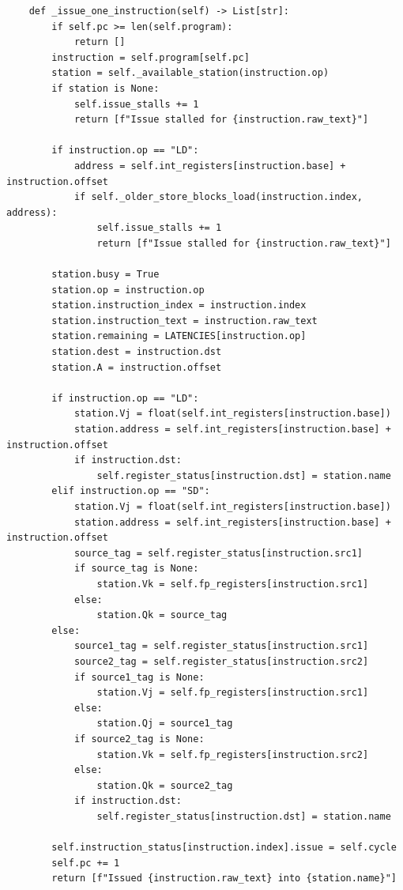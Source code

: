 \documentclass[12pt,a4paper]{ctexart}
\begin{document}
\begin{lstlisting}
    def _issue_one_instruction(self) -> List[str]:
        if self.pc >= len(self.program):
            return []
        instruction = self.program[self.pc]
        station = self._available_station(instruction.op)
        if station is None:
            self.issue_stalls += 1
            return [f"Issue stalled for {instruction.raw_text}"]

        if instruction.op == "LD":
            address = self.int_registers[instruction.base] + instruction.offset
            if self._older_store_blocks_load(instruction.index, address):
                self.issue_stalls += 1
                return [f"Issue stalled for {instruction.raw_text}"]

        station.busy = True
        station.op = instruction.op
        station.instruction_index = instruction.index
        station.instruction_text = instruction.raw_text
        station.remaining = LATENCIES[instruction.op]
        station.dest = instruction.dst
        station.A = instruction.offset

        if instruction.op == "LD":
            station.Vj = float(self.int_registers[instruction.base])
            station.address = self.int_registers[instruction.base] + instruction.offset
            if instruction.dst:
                self.register_status[instruction.dst] = station.name
        elif instruction.op == "SD":
            station.Vj = float(self.int_registers[instruction.base])
            station.address = self.int_registers[instruction.base] + instruction.offset
            source_tag = self.register_status[instruction.src1]
            if source_tag is None:
                station.Vk = self.fp_registers[instruction.src1]
            else:
                station.Qk = source_tag
        else:
            source1_tag = self.register_status[instruction.src1]
            source2_tag = self.register_status[instruction.src2]
            if source1_tag is None:
                station.Vj = self.fp_registers[instruction.src1]
            else:
                station.Qj = source1_tag
            if source2_tag is None:
                station.Vk = self.fp_registers[instruction.src2]
            else:
                station.Qk = source2_tag
            if instruction.dst:
                self.register_status[instruction.dst] = station.name

        self.instruction_status[instruction.index].issue = self.cycle
        self.pc += 1
        return [f"Issued {instruction.raw_text} into {station.name}"]


\end{lstlisting}
\end{document}
